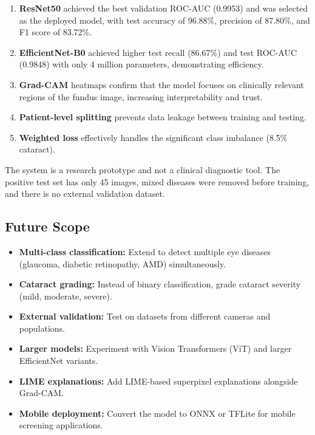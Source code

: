 \documentclass[12pt, a4paper]{article}
\begin{document}
\begin{enumerate}
    \item \textbf{ResNet50} achieved the best validation ROC-AUC (0.9953) and was selected as the deployed model, with test accuracy of 96.88\%, precision of 87.80\%, and F1 score of 83.72\%.
    \item \textbf{EfficientNet-B0} achieved higher test recall (86.67\%) and test ROC-AUC (0.9848) with only 4 million parameters, demonstrating efficiency.
    \item \textbf{Grad-CAM} heatmaps confirm that the model focuses on clinically relevant regions of the fundus image, increasing interpretability and trust.
    \item \textbf{Patient-level splitting} prevents data leakage between training and testing.
    \item \textbf{Weighted loss} effectively handles the significant class imbalance (8.5\% cataract).
\end{enumerate}

The system is a research prototype and not a clinical diagnostic tool. The positive test set has only 45 images, mixed diseases were removed before training, and there is no external validation dataset.

\subsection{Future Scope}
\begin{itemize}
    \item \textbf{Multi-class classification:} Extend to detect multiple eye diseases (glaucoma, diabetic retinopathy, AMD) simultaneously.
    \item \textbf{Cataract grading:} Instead of binary classification, grade cataract severity (mild, moderate, severe).
    \item \textbf{External validation:} Test on datasets from different cameras and populations.
    \item \textbf{Larger models:} Experiment with Vision Transformers (ViT) and larger EfficientNet variants.
    \item \textbf{LIME explanations:} Add LIME-based superpixel explanations alongside Grad-CAM.
    \item \textbf{Mobile deployment:} Convert the model to ONNX or TFLite for mobile screening applications.
\end{itemize}

\end{document}
